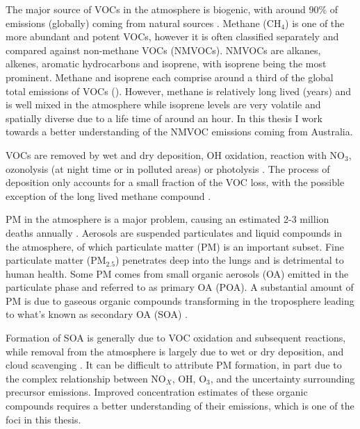   The major source of VOCs in the atmosphere is biogenic, with around 90\% of emissions (globally) coming from natural sources \citep{Guenther1995,Guenther2006, Millet2006}.
  Methane (CH$_4$) is one of the more abundant and potent VOCs, however it is often classified separately and compared against non-methane VOCs (NMVOCs).
  NMVOCs are alkanes, alkenes, aromatic hydrocarbons and isoprene, with isoprene being the most prominent.
  Methane and isoprene each comprise around a third of the global total emissions of VOCs (\cite{Guenther2006}).
  However, methane is relatively long lived (years) and is well mixed in the atmosphere while isoprene levels are very volatile and spatially diverse due to a life time of around an hour.
  In this thesis I work towards a better understanding of the NMVOC emissions coming from Australia.
  
  VOCs are removed by wet and dry deposition, OH oxidation, reaction with NO$_3$, ozonolysis (at night time or in polluted areas) or photolysis \citep{AtkinsonArey2003, Brown2009}.
  The process of deposition only accounts for a small fraction of the VOC loss, with the possible exception of the long lived methane compound \citep{AtkinsonArey2003}.
  
  PM in the atmosphere is a major problem, causing an estimated 2-3 million deaths annually \citep{Hoek2013, Krewski2009, Silva2013, Lelieveld2015}. 
  Aerosols are suspended particulates and liquid compounds in the atmosphere, of which particulate matter (PM) is an important subset.
  Fine particulate matter (PM$_{2.5}$) penetrates deep into the lungs and is detrimental to human health.
  Some PM comes from small organic aerosols (OA) emitted in the particulate phase and referred to as primary OA (POA).
  A substantial amount of PM is due to gaseous organic compounds transforming in the troposphere leading to what's known as secondary OA (SOA) \citep{Kroll2008}.
  
  Formation of SOA is generally due to VOC oxidation and subsequent reactions, while removal from the atmosphere is largely due to wet or dry deposition, and cloud scavenging \citep{Kanakidou2005}.
  It can be difficult to attribute PM formation, in part due to the complex relationship between NO$_X$, OH, O$_3$, and the uncertainty surrounding precursor emissions.
  Improved concentration estimates of these organic compounds requires a better understanding of their emissions, which is one of the foci in this thesis.
  
